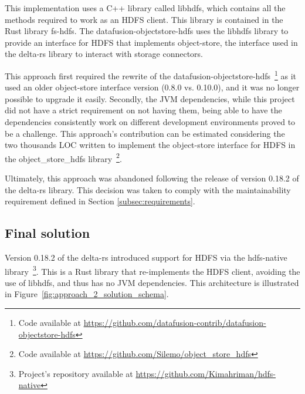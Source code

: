 This implementation uses a C++ library called libhdfs, which contains all the methods required to work as an \gls{HDFS} client. This library is contained in the Rust library fs-hdfs. The datafusion-objectstore-hdfs uses the libhdfs library to provide an interface for \gls{HDFS} that implements object-store, the interface used in the delta-rs library to interact with storage connectors.

This approach first required the rewrite of the datafusion-objectstore-hdfs~\footnote{Code available at \url{https://github.com/datafusion-contrib/datafusion-objectstore-hdfs}} as it used an older object-store interface version (0.8.0 vs. 0.10.0), and it was no longer possible to upgrade it easily. Secondly, the \gls{JVM} dependencies, while this project did not have a strict requirement on not having them, being able to have the dependencies consistently work on different development environments proved to be a challenge. This approach's contribution can be estimated considering the two thousands \gls{LOC} written to implement the object-store interface for \gls{HDFS} in the object\_store\_hdfs library~\footnote{Code available at \url{https://github.com/Silemo/object_store_hdfs}}.

Ultimately, this approach was abandoned following the release of version 0.18.2 of the delta-rs library. This decision was taken to comply with the maintainability requirement defined in Section \ref{subsec:requirements}.

\subsection{Final solution}

Version 0.18.2 of the delta-rs introduced support for \gls{HDFS} via the hdfs-native library~\footnote{Project's repository available at \url{https://github.com/Kimahriman/hdfs-native}}. This is a Rust library that re-implements the \gls{HDFS} client, avoiding the use of libhdfs, and thus has no \gls{JVM} dependencies. This architecture is illustrated in Figure~\ref{fig:approach_2_solution_schema}.

